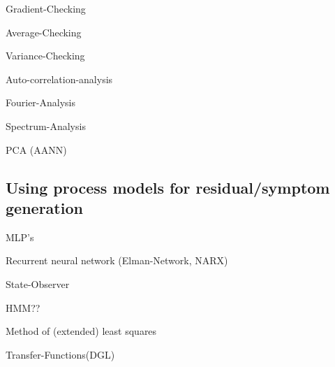 \documentclass[a4paper,11pt]{article}
\begin{document}
Gradient-Checking

Average-Checking

Variance-Checking

Auto-correlation-analysis

Fourier-Analysis

Spectrum-Analysis

PCA (AANN)


\subsection{Using process models for residual/symptom generation}
  
MLP's

Recurrent neural network (Elman-Network, NARX)

State-Observer

HMM??

Method of (extended) least squares

Transfer-Functions(DGL)

{}

\end{document}
